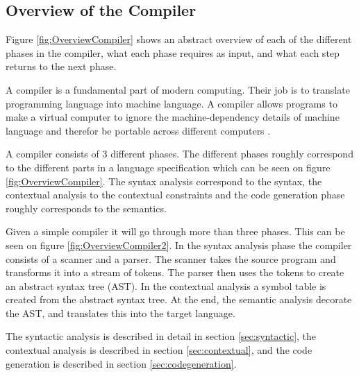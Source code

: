 \subsection{Overview of the Compiler}
\label{sec:OverviewCompiler}
Figure \ref{fig:OverviewCompiler}  shows an abstract overview of each of the different phases in the compiler, what each phase requires as input, and what each step returns to the next phase.

A compiler is a fundamental part of modern computing. Their job is to translate programming language into machine language. A compiler allows programs to make a virtual computer to ignore the machine-dependency details of machine language and therefor be portable across different computers  \citep{CraftingACompiler}.

A compiler consists of 3 different phases. The different phases roughly correspond to the different parts in a language specification which can be seen on figure \ref{fig:OverviewCompiler}. The syntax analysis correspond to the syntax, the contextual analysis to the contextual constraints and the code generation phase roughly corresponds to the semantics.

Given a simple compiler it will go through more than three phases. This can be seen on figure \ref{fig:OverviewCompiler2}. In the syntax analysis phase the compiler consists of a scanner and a parser. The scanner takes the source program and transforms it into a stream of tokens. The parser then uses the tokens to create an abstract syntax tree (AST). In the contextual analysis a symbol table is created from the abstract syntax tree. At the end, the semantic analysis decorate the AST, and translates this into the target language.

The syntactic analysis is described in detail in section \ref{sec:syntactic}, the contextual analysis is described in section \ref{sec:contextual}, and the code generation is described in section \ref{sec:codegeneration}.

